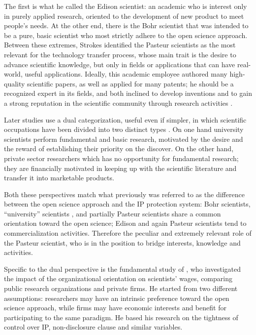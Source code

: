 The first is what he called the Edison scientist: an academic who is interest only in purely applied research, oriented to the development of new product to meet people's needs. At the other end, there is the Bohr scientist that was intended to be a pure, basic scientist who most strictly adhere to the open science approach. Between these extremes, Strokes identified the Pasteur scientists as the most relevant for the technology transfer process, whose main trait is the desire to advance scientific knowledge, but only in fields or applications that can have real-world, useful applications. Ideally, this academic employee authored many high-quality scientific papers, as well as applied for many patents; he should be a recognized expert in its fields, and both inclined to develop inventions and to gain a strong reputation in the scientific community through research activities \citep{Baba2009}.

Later studies use a dual categorization, useful even if simpler, in which scientific occupations have been divided into two distinct types \citep{Beath2000}. On one hand university scientists perform fundamental and basic research, motivated by the desire and the reward of establishing their priority on the discover. On the other hand, private sector researchers which has no opportunity for fundamental research; they are financially motivated in keeping up with the scientific literature and transfer it into marketable products. 

Both these perspectives match what previously was referred to as the difference between the open science approach and the IP protection system: Bohr scientists, \enquote{university} scientists \citep{Beath2000}, and partially Pasteur scientists share a common orientation toward the open science; Edison and again Pasteur scientists tend to commercialization activities. Therefore the peculiar and extremely relevant role of the Pasteur scientist, who is in the position to bridge interests, knowledge and activities.

Specific to the dual perspective is the fundamental study of \citet{Stern2004}, who investigated the impact of the organizational orientation on scientists' wages, comparing public research organizations and private firms. He started from two different assumptions: researchers may have an intrinsic preference toward the open science approach, while firms may have economic interests and benefit for participating to the same paradigm. He based his research on the tightness of control over IP, non-disclosure clause and similar variables.

